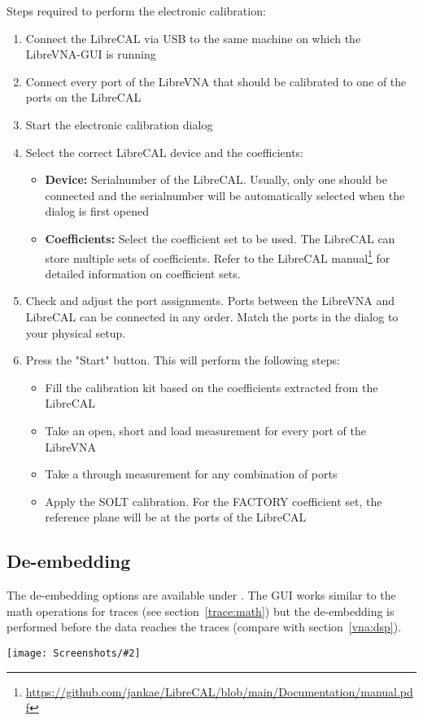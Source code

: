 \documentclass[a4paper,11pt]{article}
\newcommand{\vna}{LibreVNA}
\newcommand{\screenshot}[2]{\begin{center}
\texttt{[image: Screenshots/\#2]}
\end{center}}
\begin{document}
Steps required to perform the electronic calibration:
\begin{enumerate}
\item Connect the LibreCAL via USB to the same machine on which the \vna{}-GUI is running
\item Connect every port of the \vna{} that should be calibrated to one of the ports on the LibreCAL
\item Start the electronic calibration dialog
\item Select the correct LibreCAL device and the coefficients:
\begin{itemize}
\item \textbf{Device:} Serialnumber of the LibreCAL. Usually, only one should be connected and the serialnumber will be automatically selected when the dialog is first opened
\item \textbf{Coefficients:} Select the coefficient set to be used. The LibreCAL can store multiple sets of coefficients. Refer to the LibreCAL manual\footnote{\url{https://github.com/jankae/LibreCAL/blob/main/Documentation/manual.pdf}} for detailed information on coefficient sets.
\end{itemize}
\item Check and adjust the port assignments. Ports between the \vna{} and LibreCAL can be connected in any order. Match the ports in the dialog to your physical setup.
\item Press the "Start" button. This will perform the following steps:
\begin{itemize}
\item Fill the calibration kit based on the coefficients extracted from the LibreCAL
\item Take an open, short and load measurement for every port of the \vna{}
\item Take a through measurement for any combination of ports
\item Apply the SOLT calibration. For the FACTORY coefficient set, the reference plane will be at the ports of the LibreCAL
\end{itemize}
\end{enumerate}

\subsection{De-embedding}
The de-embedding options are available under . The GUI works similar to the math operations for traces (see section~\ref{trace:math}) but the de-embedding is performed before the data reaches the traces (compare with section~\ref{vna:dsp}).
\screenshot{0.8}{Deembedding.png}
\end{document}
